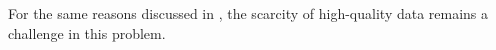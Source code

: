 

For the same reasons discussed in
, the scarcity of
high-quality data remains a challenge in this problem.
